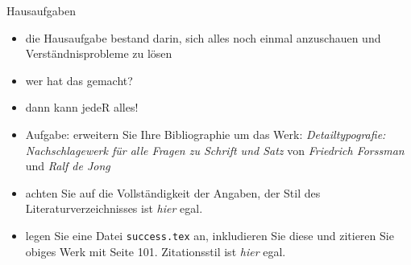 \begin{frame}[fragile]{Hausaufgaben}

\begin{itemize}[<+->]
    \item die Hausaufgabe bestand darin, sich alles noch einmal anzuschauen und Verständnisprobleme zu lösen
    \item wer hat das gemacht?
    \item dann kann jedeR alles!
    \item Aufgabe: erweitern Sie Ihre Bibliographie um das Werk: \textit{Detailtypografie: Nachschlagewerk für alle Fragen zu Schrift und Satz} von \textit{Friedrich Forssman} und \textit{Ralf de Jong}
    \item achten Sie auf die Vollständigkeit der Angaben, der Stil des Literaturverzeichnisses ist \textit{hier} egal.
    \item legen Sie eine Datei \texttt{success.tex} an, inkludieren Sie diese und zitieren Sie obiges Werk mit Seite 101. Zitationsstil ist \textit{hier} egal.
\end{itemize}

\end{frame}

